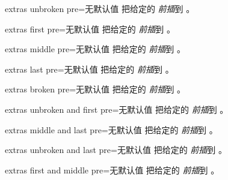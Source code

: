 \begin{docTcbKey}[][doc new=2015-07-16]{extras unbroken pre}{=}{无默认值}
  把给定的  \emph{前插}到 。
\end{docTcbKey}

\begin{docTcbKey}[][doc new=2015-07-16]{extras first pre}{=}{无默认值}
  把给定的  \emph{前插}到 。
\end{docTcbKey}

\begin{docTcbKey}[][doc new=2015-07-16]{extras middle pre}{=}{无默认值}
  把给定的  \emph{前插}到 。
\end{docTcbKey}

\begin{docTcbKey}[][doc new=2015-07-16]{extras last pre}{=}{无默认值}
  把给定的  \emph{前插}到 。
\end{docTcbKey}

\begin{docTcbKey}[][doc new=2015-07-16]{extras broken pre}{=}{无默认值}
  把给定的  \emph{前插}到 。
\end{docTcbKey}

\begin{docTcbKey}[][doc new=2015-07-16]{extras unbroken and first pre}{=}{无默认值}
  把给定的  \emph{前插}到 。
\end{docTcbKey}

\begin{docTcbKey}[][doc new=2015-07-16]{extras middle and last pre}{=}{无默认值}
  把给定的  \emph{前插}到 。
\end{docTcbKey}

\begin{docTcbKey}[][doc new=2015-07-16]{extras unbroken and last pre}{=}{无默认值}
  把给定的  \emph{前插}到 。
\end{docTcbKey}

\begin{docTcbKey}[][doc new=2015-07-16]{extras first and middle pre}{=}{无默认值}
  把给定的  \emph{前插}到 。
\end{docTcbKey}


